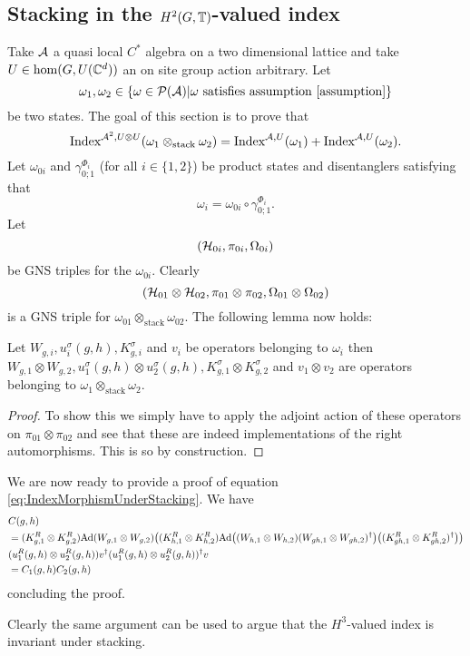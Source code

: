 \documentclass[11pt,a4paper,twoside]{article}
\numberwithin{equation}{section}
\begin{document}
\subsection{Stacking in the $H^2(G,\TT)$-valued index}\label{sec:StackingOneTranslation}
Take $\AA$ a quasi local $C^*$ algebra on a two dimensional lattice and take $U\in\hom(G,U(\CC^d))$ an on site group action arbitrary. Let
\begin{equation}
	\omega_1,\omega_2\in\{\omega\in\PP(\AA)|\omega\text{ satisfies assumption \ref{assumption}}\}
\end{equation}
be two states. The goal of this section is to prove that
\begin{equation}\label{eq:IndexMorphismUnderStacking}
	\textrm{Index}^{\AA^2,U\otimes U}(\omega_1\otimes_{\text{stack}}\omega_2)=\textrm{Index}^{\AA,U}(\omega_1)+\textrm{Index}^{\AA,U}(\omega_2).
\end{equation}
Let $\omega_{0i}$ and $\gamma_{0;1}^{\Phi_i}$ (for all $i\in\{1,2\}$) be product states and disentanglers satisfying that
\begin{equation}
	\omega_i=\omega_{0i}\circ\gamma_{0;1}^{\Phi_i}.
\end{equation}
Let
\begin{equation}
	(\HH_{0i},\pi_{0i},\Omega_{0i})
\end{equation}
be GNS triples for the $\omega_{0i}$. Clearly
\begin{equation}
	(\HH_{01}\otimes\HH_{02},\pi_{01}\otimes\pi_{02},\Omega_{01}\otimes\Omega_{02})
\end{equation}
is a GNS triple for $\omega_{01}\otimes_{\text{stack}}\omega_{02}$. The following lemma now holds:
\begin{lemma}
	Let $W_{g,i},u^\sigma_i(g,h),K_{g,i}^\sigma$ and $v_{i}$ be operators belonging to $\omega_i$ then $W_{g,1}\otimes W_{g,2},u^\sigma_1(g,h)\otimes u^\sigma_2(g,h),K_{g,1}^\sigma\otimes K_{g,2}^\sigma$ and $v_{1}\otimes v_{2}$ are operators belonging to $\omega_1\otimes_{\text{stack}}\omega_2$.
\end{lemma}
\begin{proof}
	To show this we simply have to apply the adjoint action of these operators on $\pi_{01}\otimes\pi_{02}$ and see that these are indeed implementations of the right automorphisms. This is so by construction.
\end{proof}
We are now ready to provide a proof of equation \ref{eq:IndexMorphismUnderStacking}. We have
\begin{align}
	&C(g,h)\\
	\nonumber
	&=(K_{g,1}^R\otimes K_{g,2}^R)\Ad{W_{g,1}\otimes W_{g,2}}\left((K_{h,1}^R\otimes K_{h,2}^R)\Ad{(W_{h,1}\otimes W_{h,2})(W_{gh,1}\otimes W_{gh,2})^\dagger}\left((K_{gh,1}^R\otimes K_{gh,2}^R)^\dagger\right)\right)\\
	&(u^R_1(g,h)\otimes u^R_2(g,h))v^\dagger (u^R_1(g,h)\otimes u^R_2(g,h))^\dagger v\\
	&=C_1(g,h)C_2(g,h)
\end{align}
concluding the proof.
\begin{remark}\label{rem:StackingH3ValuedIndex}
	Clearly the same argument can be used to argue that the $H^3$-valued index is invariant under stacking.
\end{remark}
\end{document}
